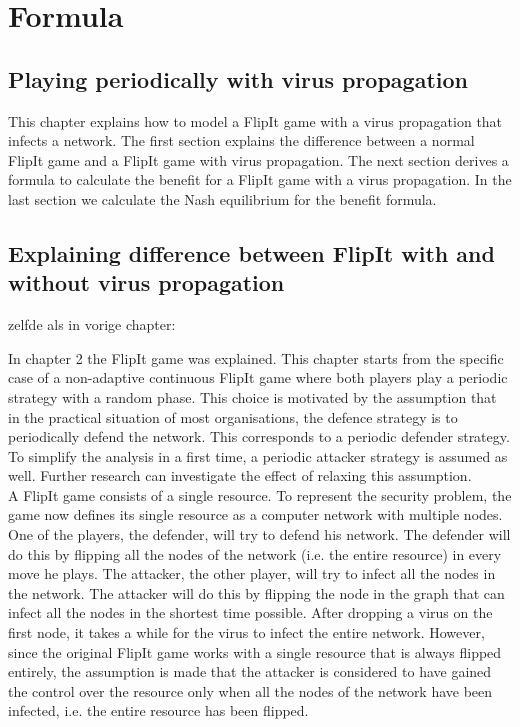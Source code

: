 \chapter{Formula}
\label{cha:9}
%




\section*{Playing periodically with virus propagation}

This chapter explains how to model a FlipIt game with a virus propagation that infects a network. The first section explains the difference between a normal FlipIt game and a FlipIt game with virus propagation. The next section derives a formula to calculate the benefit for a FlipIt game with a virus propagation. In the last section we calculate the Nash equilibrium for the benefit formula.

\section{Explaining difference between FlipIt with and without virus propagation}
zelfde als in vorige chapter:

In chapter 2 the FlipIt game was explained.  This chapter starts from the specific case of a non-adaptive continuous FlipIt game where both players play a periodic strategy with a random phase. This choice is motivated by the assumption that in the practical situation of most organisations, the defence strategy is to periodically defend the network. This corresponds to a periodic defender strategy. To simplify the analysis in a first time, a periodic attacker strategy is assumed as well. Further research can investigate the effect of relaxing this assumption.\\


A FlipIt game consists of a single resource. To represent the security problem, the game now defines its single resource as a computer network with multiple
nodes. One of the players, the defender, will try to defend his network. The defender
will do this by flipping all the nodes of the network (i.e. the entire resource) in every move he plays. The
attacker, the other player, will try to infect all the nodes in the network. The attacker
will do this by flipping the node in the graph that can infect all the nodes in the
shortest time possible. After dropping a virus on the first node, it takes a while for the virus to infect the entire network. However, since the original FlipIt game works with a single resource that is always flipped entirely, the assumption is made that the attacker is considered to have gained the control over the resource only when all the nodes of the network have been infected, i.e. the entire resource has been flipped.

